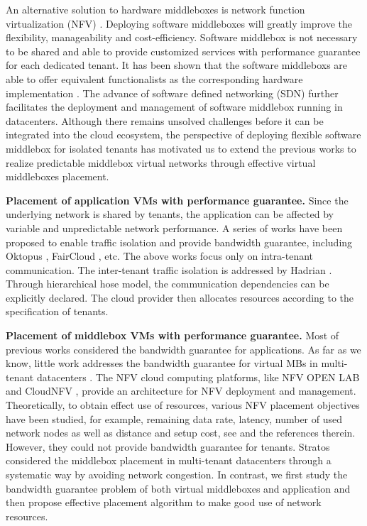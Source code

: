 \documentclass[review]{elsarticle}
\begin{document}
An alternative solution to hardware middleboxes is network function virtualization (NFV) \cite{NFV}. Deploying software middleboxes will greatly improve the flexibility, manageability and cost-efficiency. Software middlebox is not necessary to be shared and able to provide customized services with performance guarantee for each dedicated tenant. It has been shown that the software middleboxs are able to offer equivalent functionalists as the corresponding hardware implementation \cite{D12tpp, S12dai, G13dio, ClickOS}. The advance of software defined networking (SDN) further facilitates the deployment and management of software middlebox running in datacenters. Although there remains unsolved challenges before it can be integrated into the cloud ecosystem, the perspective of deploying flexible software middlebox for isolated tenants has motivated us to extend the previous works to realize predictable middlebox virtual networks through effective virtual middleboxes placement.


\textbf{Placement of application VMs with performance guarantee.}
Since the underlying network is shared by tenants, the application can be affected by variable and unpredictable network performance. A series of works have been proposed to enable traffic isolation and provide bandwidth guarantee, including Oktopus \cite{B11tpd}, FairCloud \cite{P12fst}, etc. The above works focus only on intra-tenant communication. The inter-tenant traffic isolation is addressed by Hadrian \cite{B13cta}. Through hierarchical hose model, the communication dependencies can be explicitly declared. The cloud provider then allocates resources according to the specification of tenants. 

\textbf{Placement of middlebox VMs with performance guarantee.}
Most of previous works considered the bandwidth guarantee for applications. As far as we know, little work addresses the bandwidth guarantee for virtual MBs in multi-tenant datacenters \cite{nfv_challenges}. The NFV cloud computing platforms, like NFV OPEN LAB \cite{HuaweiNFV} and CloudNFV \cite{CloudNFV}, provide an architecture for NFV deployment and management.
 Theoretically, to obtain effect use of resources, various NFV placement objectives have been studied, for example, remaining data rate, latency, number of used network nodes as well as distance and setup cost, see \cite{M14sap, cohen2015near} and the references therein. However, they could not provide bandwidth guarantee for tenants. Stratos \cite{stratos12} considered the middlebox placement in multi-tenant datacenters through a systematic way by avoiding network congestion. In contrast, we first study the bandwidth guarantee
 problem of both virtual middleboxes and application and then propose effective placement algorithm to make good use of network resources.
 
\end{document}
